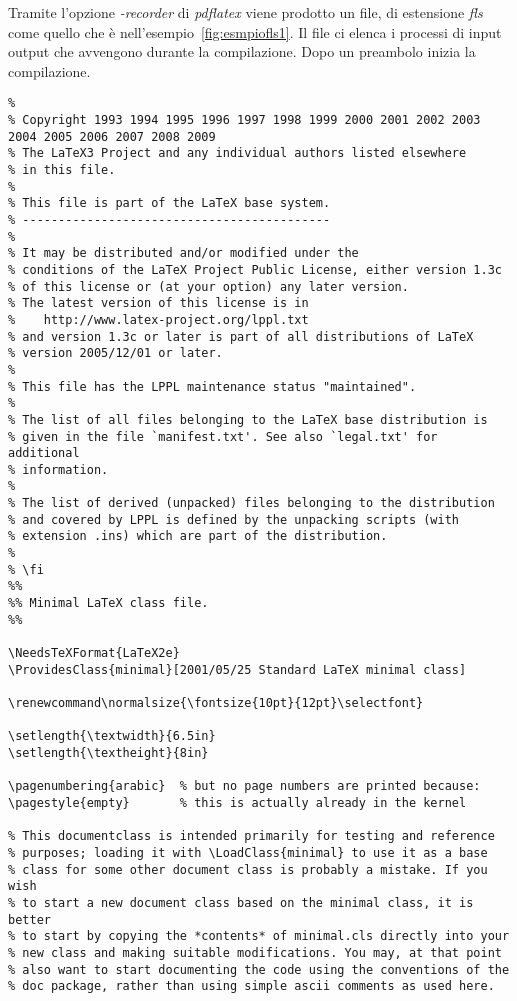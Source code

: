 Tramite l'opzione \textit{-recorder}  di \textit{pdflatex} 
viene prodotto un file, di estensione \textit{fls} come quello che è nell'esempio~\vref{fig:esmpiofls1}. Il file ci elenca i processi di input output che avvengono durante la compilazione. Dopo un preambolo inizia la compilazione.
\begin{lstlisting}[float,caption={Esempio Minimal.cls},label=minimacls1,firstline=30,lastline=45,captionpos=b]
% \iffalse meta-comment
%
% Copyright 1993 1994 1995 1996 1997 1998 1999 2000 2001 2002 2003 2004 2005 2006 2007 2008 2009
% The LaTeX3 Project and any individual authors listed elsewhere
% in this file.
%
% This file is part of the LaTeX base system.
% -------------------------------------------
%
% It may be distributed and/or modified under the
% conditions of the LaTeX Project Public License, either version 1.3c
% of this license or (at your option) any later version.
% The latest version of this license is in
%    http://www.latex-project.org/lppl.txt
% and version 1.3c or later is part of all distributions of LaTeX
% version 2005/12/01 or later.
%
% This file has the LPPL maintenance status "maintained".
%
% The list of all files belonging to the LaTeX base distribution is
% given in the file `manifest.txt'. See also `legal.txt' for additional
% information.
%
% The list of derived (unpacked) files belonging to the distribution
% and covered by LPPL is defined by the unpacking scripts (with
% extension .ins) which are part of the distribution.
%
% \fi
%%
%% Minimal LaTeX class file.
%%

\NeedsTeXFormat{LaTeX2e}
\ProvidesClass{minimal}[2001/05/25 Standard LaTeX minimal class]

\renewcommand\normalsize{\fontsize{10pt}{12pt}\selectfont}

\setlength{\textwidth}{6.5in}
\setlength{\textheight}{8in}

\pagenumbering{arabic}  % but no page numbers are printed because:
\pagestyle{empty}       % this is actually already in the kernel

% This documentclass is intended primarily for testing and reference
% purposes; loading it with \LoadClass{minimal} to use it as a base
% class for some other document class is probably a mistake. If you wish
% to start a new document class based on the minimal class, it is better
% to start by copying the *contents* of minimal.cls directly into your
% new class and making suitable modifications. You may, at that point
% also want to start documenting the code using the conventions of the
% doc package, rather than using simple ascii comments as used here.
\end{lstlisting}

